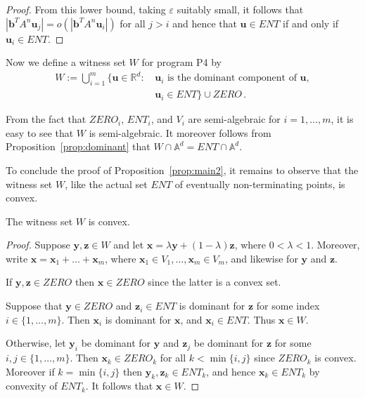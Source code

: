 \begin{proof}
From this lower bound, taking $\varepsilon$ suitably small, it follows
that $|\boldsymbol{b}^TA^n\boldsymbol{u}_j|=o(|\boldsymbol{b}^TA^n
\boldsymbol{u}_i|)$ for all $j>i$ and hence that
$\boldsymbol{u}\in\mathit{ENT}$ if and only if $\boldsymbol{u}_i\in
\mathit{ENT}$.
\end{proof}

Now we define a witness set $W$ for program \textsf{P4} by
\begin{align*}
W :=   \bigcup_{i=1}^m \{\boldsymbol{u}\in \mathbb{R}^d: \,
         & \boldsymbol{u}_i \mbox{ is the dominant component of } \boldsymbol{u},\\
         & \boldsymbol{u}_i \in \mathit{ENT} \}
\cup \mathit{ZERO} \, .
\end{align*}

From the fact that $\mathit{ZERO}_i$, $\mathit{ENT}_i$, and $V_i$ are
semi-algebraic for $i=1,\ldots,m$, it is easy to see that $W$ is
semi-algebraic.  It moreover follows from Proposition~\ref{prop:dominant}
that $W \cap \mathbb{A}^d = \mathit{ENT} \cap \mathbb{A}^d$.

To conclude the proof of Proposition~\ref{prop:main2}, it
remains to observe that the witness set $W$, like the actual set
$\mathit{ENT}$ of eventually non-terminating points, is convex.
\begin{proposition}
The witness set $W$ is convex.
\end{proposition}
\begin{proof}
  Suppose $\boldsymbol y,\boldsymbol z\in W$ and let $\boldsymbol
  x=\lambda\boldsymbol y+(1-\lambda)\boldsymbol z$, where $0 < \lambda
  < 1$. Moreover, write
  $\boldsymbol{x}=\boldsymbol{x}_1+\ldots+\boldsymbol{x}_m$, where
  $\boldsymbol{x}_1\in V_1,\ldots,\boldsymbol{x}_m\in V_m$, and
  likewise for $\boldsymbol{y}$ and $\boldsymbol{z}$.

If $\boldsymbol{y},\boldsymbol{z}\in \mathit{ZERO}$ then
$\boldsymbol{x}\in \mathit{ZERO}$ since the latter is a convex set.

Suppose that $\boldsymbol{y}\in \mathit{ZERO}$ and $\boldsymbol{z}_i \in \mathit{ENT}$ is dominant for $\boldsymbol{z}$ for some index $i\in\{1,\ldots,m\}$.
Then $\boldsymbol{x}_i$ is dominant for $\boldsymbol{x}$, and
$\boldsymbol{x}_i \in \mathit{ENT}$.  Thus $\boldsymbol{x}\in W$.

Otherwise, let $\boldsymbol y_i$ be dominant for $\boldsymbol y$ and
$\boldsymbol z_j$ be dominant for $\boldsymbol z$ for some
$i,j\in\{1,\ldots,m\}$.  Then $\boldsymbol x_k\in \mathit{ZERO}_k$ for
all $k<\min\lbrace i,j\rbrace$ since $\mathit{ZERO}_k$ is convex.
Moreover if $k=\min\lbrace i,j\rbrace$ then $\boldsymbol
y_k,\boldsymbol z_k \in \mathit{ENT}_k$, and hence $\boldsymbol x_k
\in \mathit{ENT}_k$ by convexity of $\mathit{ENT}_k$.  It follows that
$\boldsymbol{x}\in W$.
\end{proof}

